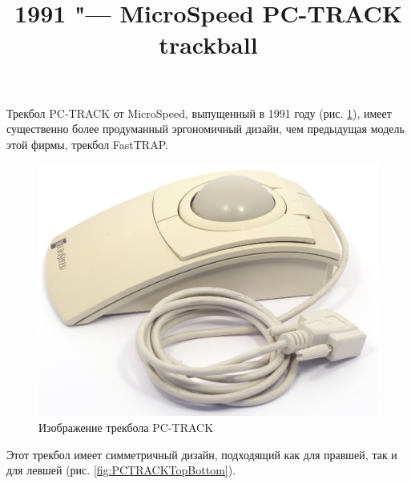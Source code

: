 \documentclass[11pt, a4paper]{article}
\begin{document}
\title{1991 "--- MicroSpeed PC-TRACK trackball}
\date{}
\maketitle
Трекбол PC-TRACK от MicroSpeed, выпущенный в 1991 году (рис. \ref{fig:PCTRACKPic}), имеет существенно более продуманный эргономичный дизайн, чем предыдущая модель этой фирмы, трекбол FastTRAP.

\begin{figure}[h]
    \centering
    \includegraphics[scale=0.4]{1991_microspeed_pc-track/pic_30.jpg}
    \caption{Изображение трекбола PC-TRACK}
    \label{fig:PCTRACKPic}
\end{figure}

Этот трекбол имеет симметричный дизайн, подходящий как для правшей, так и для левшей (рис. \ref{fig:PCTRACKTopBottom}). 
\end{document}
